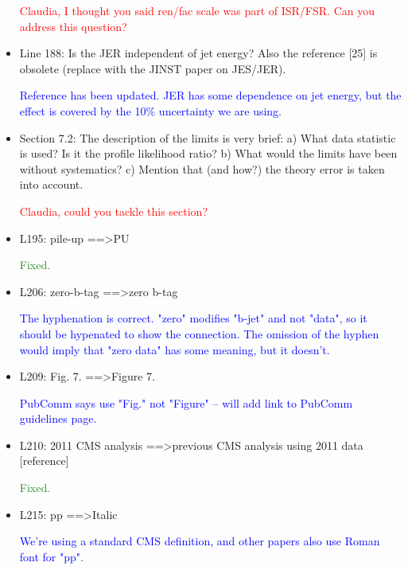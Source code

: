 \documentclass[paper=a4, fontsize=11pt]{scrartcl}
\begin{document}
\begin{itemize}
\textcolor{Red}{Claudia, I thought you said ren/fac scale was part of ISR/FSR. Can you
address this question?}\\

\item Line 188: 
Is the JER independent of jet energy? Also the reference [25] is obsolete 
(replace with the JINST paper on JES/JER). 

\textcolor{Blue}{Reference has been updated. JER has some dependence on jet energy, but
the effect is covered by the 10\% uncertainty we are using.}\\

\item Section 7.2: 
The description of the limits is very brief: 
a) What data statistic is used? Is it the profile likelihood ratio? 
b) What would the limits have been without systematics? 
c) Mention that (and how?) the theory error is taken into account. 

\textcolor{Red}{Claudia, could you tackle this section?}\\

\item L195: 
pile-up ==\textgreater PU 

\textcolor{ForestGreen}{Fixed.}\\

\item L206: 
zero-b-tag ==\textgreater zero b-tag 

\textcolor{Blue}{The hyphenation is correct. "zero" modifies "b-jet" and not "data", so it
should be hypenated to show the connection. The omission of the hyphen would imply that "zero data" has some meaning, but it doesn't.}\\

\item L209: 
Fig. 7. ==\textgreater Figure 7. 

\textcolor{Blue}{PubComm says use "Fig." not "Figure" -- will add link to PubComm guidelines page.}\\


\item L210: 
2011 CMS analysis ==\textgreater previous CMS analysis using 2011 data [reference] 

\textcolor{ForestGreen}{Fixed.}\\


\item L215: 
pp ==\textgreater Italic 

\textcolor{Blue}{We're using a standard CMS definition, and other papers also use Roman font for "pp".}\\


\end{itemize}
\end{document}
